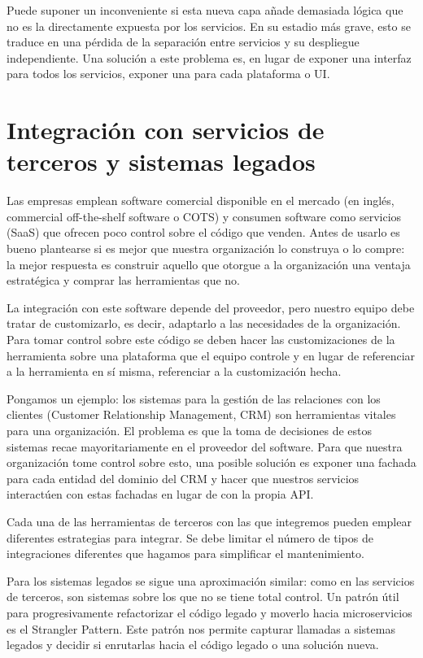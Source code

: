 \documentclass[11pt,a4paper]{article}
\begin{document}
Puede suponer un inconveniente si esta nueva capa añade demasiada lógica que no es la directamente expuesta por los servicios. En su estadio más grave, esto se traduce en una pérdida de la separación entre servicios y su despliegue independiente. Una solución a este problema es, en lugar de exponer una interfaz para todos los servicios, exponer una para cada plataforma o UI.

\part{Integración con servicios de terceros y sistemas legados}

Las empresas emplean software comercial disponible en el mercado (en inglés, commercial off-the-shelf software o COTS) y consumen software como servicios (SaaS) que ofrecen poco control sobre el código que venden. Antes de usarlo es bueno plantearse si es mejor que nuestra organización lo construya o lo compre: la mejor respuesta es construir aquello que otorgue a la organización una ventaja estratégica y comprar las herramientas que no.

La integración con este software depende del proveedor, pero nuestro equipo debe tratar de customizarlo, es decir, adaptarlo a las necesidades de la organización. Para tomar control sobre este código se deben hacer las customizaciones de la herramienta sobre una plataforma que el equipo controle y en lugar de referenciar a la herramienta en sí misma, referenciar a la customización hecha. 

Pongamos un ejemplo: los sistemas para la gestión de las relaciones con los clientes (Customer Relationship Management, CRM) son herramientas vitales para una organización. El problema es que la toma de decisiones de estos sistemas recae mayoritariamente en el proveedor del software. Para que nuestra organización tome control sobre esto, una posible solución es exponer una fachada para cada entidad del dominio del CRM y hacer que nuestros servicios interactúen con estas fachadas en lugar de con la propia API. 

Cada una de las herramientas de terceros con las que integremos pueden emplear diferentes estrategias para integrar. Se debe limitar el número de tipos de integraciones diferentes que hagamos para simplificar el mantenimiento.

Para los sistemas legados se sigue una aproximación similar: como en las servicios de terceros, son sistemas sobre los que no se tiene total control. Un patrón útil para progresivamente refactorizar el código legado y moverlo hacia microservicios es el Strangler Pattern. Este patrón nos permite capturar llamadas a sistemas legados y decidir si enrutarlas hacia el código legado o una solución nueva. 
\end{document}
